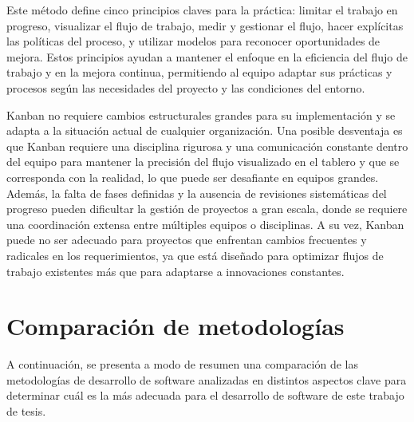 Este método define cinco principios claves para la práctica: limitar el trabajo en progreso, visualizar el flujo de trabajo, medir y gestionar el flujo, hacer explícitas las políticas del proceso, y utilizar modelos para reconocer oportunidades de mejora. Estos principios ayudan a mantener el enfoque en la eficiencia del flujo de trabajo y en la mejora continua, permitiendo al equipo adaptar sus prácticas y procesos según las necesidades del proyecto y las condiciones del entorno.

Kanban no requiere cambios estructurales grandes para su implementación y se adapta a la situación actual de cualquier organización. Una posible desventaja es que Kanban requiere una disciplina rigurosa y una comunicación constante dentro del equipo para mantener la precisión del flujo visualizado en el tablero y que se corresponda con la realidad, lo que puede ser desafiante en equipos grandes. Además, la falta de fases definidas y la ausencia de revisiones sistemáticas del progreso pueden dificultar la gestión de proyectos a gran escala, donde se requiere una coordinación extensa entre múltiples equipos o disciplinas. A su vez, Kanban puede no ser adecuado para proyectos que enfrentan cambios frecuentes y radicales en los requerimientos, ya que está diseñado para optimizar flujos de trabajo existentes más que para adaptarse a innovaciones constantes.

\section{Comparación de metodologías}

A continuación, se presenta a modo de resumen una comparación de las metodologías de desarrollo de software analizadas en distintos aspectos clave para determinar cuál es la más adecuada para el desarrollo de software de este trabajo de tesis.

